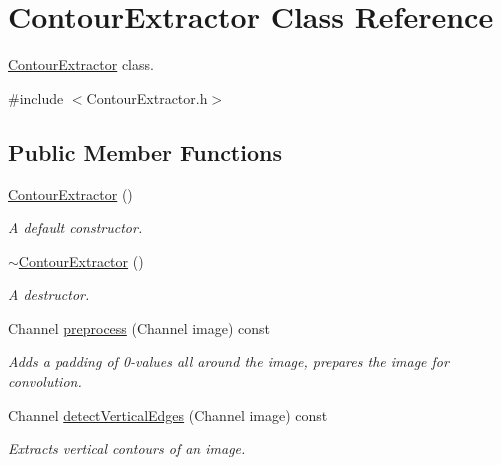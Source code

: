 \hypertarget{class_contour_extractor}{}\section{Contour\+Extractor Class Reference}
\label{class_contour_extractor}


\hyperlink{class_contour_extractor}{Contour\+Extractor} class.  




{\ttfamily \#include $<$Contour\+Extractor.\+h$>$}

\subsection*{Public Member Functions}
\begin{DoxyCompactItemize}
\item 
\mbox{\label{class_contour_extractor_ad0370155907a30ec5763f447987a0f5c}} 
\hyperlink{class_contour_extractor_ad0370155907a30ec5763f447987a0f5c}{Contour\+Extractor} ()
\begin{DoxyCompactList}\small\item\em A default constructor. \end{DoxyCompactList}\item 
\mbox{\label{class_contour_extractor_a68a81d44d414657b4fd8d470416e8ff4}} 
\hyperlink{class_contour_extractor_a68a81d44d414657b4fd8d470416e8ff4}{$\sim$\+Contour\+Extractor} ()
\begin{DoxyCompactList}\small\item\em A destructor. \end{DoxyCompactList}\item 
Channel \hyperlink{class_contour_extractor_a9c75f77327e9b74e3161963c4784d205}{preprocess} (Channel image) const
\begin{DoxyCompactList}\small\item\em Adds a padding of 0-\/values all around the image, prepares the image for convolution. \end{DoxyCompactList}\item 
Channel \hyperlink{class_contour_extractor_a3aafc89132984a7b7042f748439b58fb}{detect\+Vertical\+Edges} (Channel image) const
\begin{DoxyCompactList}\small\item\em Extracts vertical contours of an image. \end{DoxyCompactList}\item 

\end{DoxyCompactItemize}
